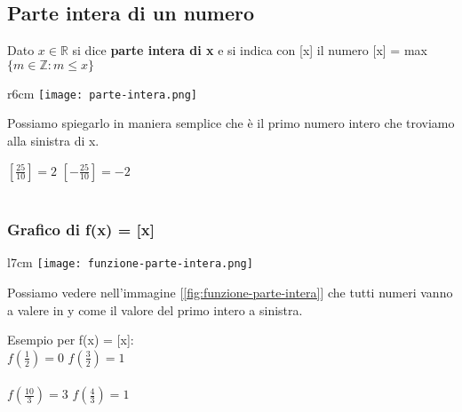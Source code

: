 \newpage
\subsection{Parte intera di un numero}
\begin{definition}
    Dato $x \in \mathbb{R}$ si dice \textbf{parte intera di x} e si indica con [x] il numero [x] = max$\{m \in \mathbb{Z}: m \leq x\}$
\end{definition}
\begin{wrapfigure}{r}{6cm}
    \vspace{-15pt}
    \centering
    \texttt{[image: parte-intera.png]}
    \caption{Parte intera di x}
    \label{fig:my_label}
\end{wrapfigure}
Possiamo spiegarlo in maniera semplice che è il primo numero intero che troviamo alla sinistra di x.
\begin{example}
    $[\frac{25}{10}] = 2$ \hspace{.5cm} $[-\frac{25}{10}] = -2$\\ \\
\end{example}

\vspace{-20pt}
\subsubsection{Grafico di f(x) = [x]}
\begin{wrapfigure}[8]{l}{7cm}
    \vspace{-25pt}
    \centering
    \texttt{[image: funzione-parte-intera.png]}
    \caption{Grafico f(x) = [x]}
    \label{fig:funzione-parte-intera}
\end{wrapfigure}
\vspace{20pt}
Possiamo vedere nell'immagine [\ref{fig:funzione-parte-intera}] che tutti numeri vanno a valere in y come il valore del primo intero a sinistra.
\begin{example}
    Esempio per f(x) = [x]:\\
    $f(\frac{1}{2}) = 0$ \hspace{.3cm} $f(\frac{3}{2}) = 1$\\ \\
    $f(\frac{10}{3}) = 3$ \hspace{.3cm} $f(\frac{4}{3}) = 1$\\ \\ \\
\end{example}

